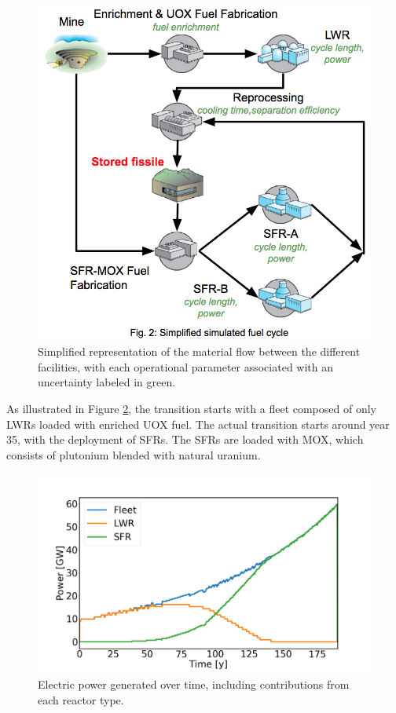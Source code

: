 \documentclass{anstrans}
\begin{document}
\begin{figure}[b] %
  \centering
  \includegraphics[scale=0.31]{cycle.png}
  \caption{Simplified representation of the material flow between the different facilities,
  with each operational parameter associated with an
  uncertainty labeled in green.}\label{fig:cycle}
\end{figure}


As illustrated in Figure \ref{fig:power}, the transition starts with a fleet
composed of only \glspl{LWR} loaded with enriched \gls{UOX} fuel.  The actual
transition starts around year 35, with the deployment of \glspl{SFR}. The
\glspl{SFR} are loaded with \gls{MOX}, which consists of plutonium blended with
natural uranium.

\begin{figure}[t] %
    \centering
    \includegraphics[scale=0.18]{power.png}
    \caption{Electric power generated over time, including contributions from each reactor type.}
    \label{fig:power}
\end{figure}
\end{document}
